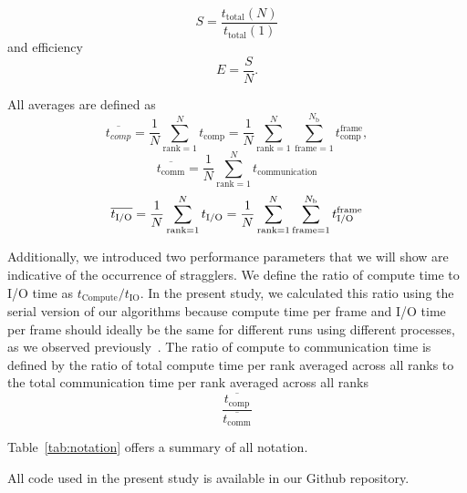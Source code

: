 \begin{equation}
  \label{eq:speedup}
  S = \frac{t_{\text{total}}(N)}{t_{\text{total}}(1)}
\end{equation}
and efficiency
\begin{equation}
  \label{eq:efficiency}
  E = \frac{S}{N}.
\end{equation}

All averages are defined as
\begin{equation}
\overline{t_{comp}} = \frac{1}{N}
\sum_{\text{rank}=1}^{N}t_{\text{comp}} = \frac{1}{N}\sum_{\text{rank}=1}^{N}\sum_{\text{frame}=1}^{N_\text{b}}t_{\text{comp}}^{\text{frame}},
\end{equation}
\begin{equation}
\overline{t_{\text{comm}}} = \frac{1}{N}\sum_{\text{rank}=1}^{N}t_{\text{communication}}
\end{equation}
\begin{equation}
\overline{{t}_{\text{I/O}}} = \frac{1}{N}\sum_{\text{rank}=1}^{N}{t}_{\text{I/O}} = \frac{1}{N}\sum_{\text{rank}=1}^{N}\sum_{\text{frame}=1}^{N_{\text{b}}}t_{\text{I/O}}^{\text{frame}}
\end{equation}

Additionally, we introduced two performance parameters that we will show are indicative of the occurrence of stragglers.
We define the ratio of compute time to I/O time as $t_{\text{Compute}}/t_{\text{IO}}$. 
In the present study, we calculated this ratio using the serial version of our algorithms because compute time per frame and I/O time per frame should ideally be the same for different runs using different processes, as we observed previously~\cite{Khoshlessan:2017ab}.
The ratio of compute to communication time is defined by the ratio of total compute time per rank averaged across all ranks to the total communication time per rank averaged across all ranks 
\begin{equation}
  \label{eq:Compute-comm}
  \frac{\overline{t_{\text{comp}}}}{\overline{t_{\text{comm}}}}
\end{equation}

Table~\ref{tab:notation} offers a summary of all notation.

All code used in the present study is available in our Github repository. 
 
